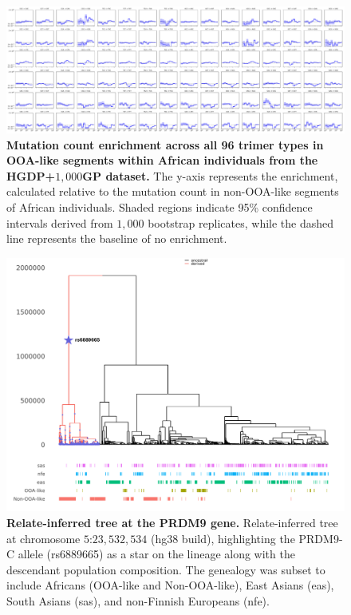 \begin{figure}
    \centering
    \includegraphics[width=\textwidth]{figures/gb_deepadmix/mutrates_output_deepadmix_afr.pdf}
    \caption{\textbf{Mutation count enrichment across all 96 trimer types in OOA-like segments within African individuals from the HGDP+$1{,}000$GP dataset.} The y-axis represents the enrichment, calculated relative to the mutation count in non-OOA-like segments of African individuals. Shaded regions indicate 95\% confidence intervals derived from $1{,}000$ bootstrap replicates, while the dashed line represents the baseline of no enrichment.}
    \label{fig:gb-mutational-all-deep}
\end{figure}

\begin{figure}
    \centering
    \includegraphics[width=\textwidth]{figures/gb_deepadmix/gb_real_deep_prdm9c_tree.pdf}
    \caption{\textbf{Relate-inferred tree at the PRDM9 gene.} 
    Relate-inferred tree at chromosome $5$:$23{,}532{,}534$ (hg38 build), highlighting the PRDM9-C allele (rs6889665) as a star on the lineage along with the descendant population composition. The genealogy was subset to include Africans (OOA-like and Non-OOA-like), East Asians (eas), South Asians (sas), and non-Finnish Europeans (nfe).}
    \label{fig:gb_deep_prdm9c_tree}
\end{figure}

